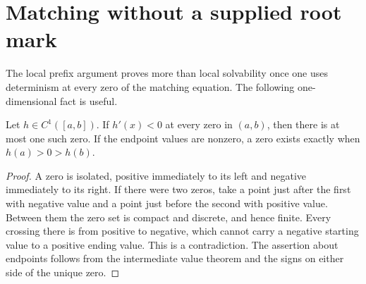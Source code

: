 \section{Matching without a supplied root mark}
\label{sec:v78-root}

The local prefix argument proves more than local solvability once one
uses determinism at every zero of the matching equation.  The following
one-dimensional fact is useful.

\begin{lemma}\label{lem:v78-downward}
Let $h\in C^1([a,b])$.  If $h'(x)<0$ at every zero in $(a,b)$,
then there is at most one such zero.  If the endpoint values are nonzero,
a zero exists exactly when $h(a)>0>h(b)$.
\end{lemma}
\begin{proof}
A zero is isolated, positive immediately to its left and negative
immediately to its right.  If there were two zeros, take a point just
after the first with negative value and a point just before the second
with positive value.  Between them the zero set is compact and discrete,
and hence finite.  Every crossing there is from positive to negative,
which cannot carry a negative starting value to a positive ending value.
This is a contradiction.  The assertion about endpoints follows from
the intermediate value theorem and the signs on either side of the
unique zero.
\end{proof}

